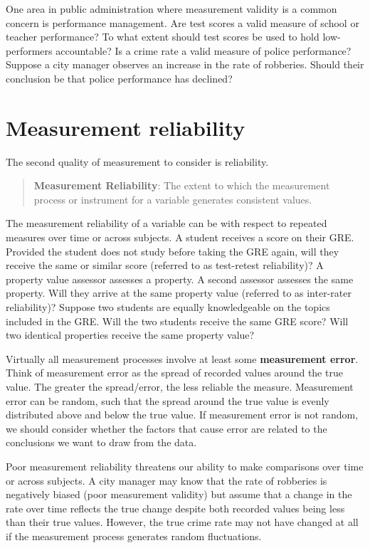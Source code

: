 \documentclass[
]{book}
\begin{document}
One area in public administration where measurement validity is a common concern is performance management. Are test scores a valid measure of school or teacher performance? To what extent should test scores be used to hold low-performers accountable? Is a crime rate a valid measure of police performance? Suppose a city manager observes an increase in the rate of robberies. Should their conclusion be that police performance has declined?

\hypertarget{measurement-reliability}{%
\section{Measurement reliability}\label{measurement-reliability}}

The second quality of measurement to consider is reliability.

\begin{quote}
\textbf{Measurement Reliability}: The extent to which the measurement process or instrument for a variable generates consistent values.
\end{quote}

The measurement reliability of a variable can be with respect to repeated measures over time or across subjects. A student receives a score on their GRE. Provided the student does not study before taking the GRE again, will they receive the same or similar score (referred to as test-retest reliability)? A property value assessor assesses a property. A second assessor assesses the same property. Will they arrive at the same property value (referred to as inter-rater reliability)? Suppose two students are equally knowledgeable on the topics included in the GRE. Will the two students receive the same GRE score? Will two identical properties receive the same property value?

Virtually all measurement processes involve at least some \textbf{measurement error}. Think of measurement error as the spread of recorded values around the true value. The greater the spread/error, the less reliable the measure. Measurement error can be random, such that the spread around the true value is evenly distributed above and below the true value. If measurement error is not random, we should consider whether the factors that cause error are related to the conclusions we want to draw from the data.

Poor measurement reliability threatens our ability to make comparisons over time or across subjects. A city manager may know that the rate of robberies is negatively biased (poor measurement validity) but assume that a change in the rate over time reflects the true change despite both recorded values being less than their true values. However, the true crime rate may not have changed at all if the measurement process generates random fluctuations.
\end{document}
